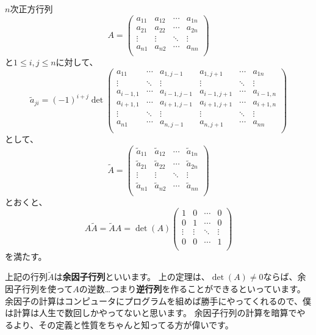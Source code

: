 \begin{theorem}
  $n$次正方行列
  \[
    A=\begin{pmatrix}
      a_{11} & a_{12} & \cdots & a_{1n}\\
      a_{21} & a_{22} & \cdots & a_{2n}\\
      \vdots & \vdots & \ddots & \vdots\\
      a_{n1} & a_{n2} & \cdots & a_{nn}\\
    \end{pmatrix}
  \]
  と$1\leq i,j\leq n$に対して、
  \[
    \widetilde{a}_{ji}=(-1)^{i+j}\det\begin{pmatrix}
      a_{11} & \cdots & a_{1,j-1} & a_{1,j+1} & \cdots & a_{1n}\\
      \vdots & \ddots & \vdots & \vdots & \ddots & \vdots\\
      a_{i-1,1} & \cdots & a_{i-1,j-1} & a_{i-1,j+1} & \cdots & a_{i-1,n}\\
      a_{i+1,1} & \cdots & a_{i+1,j-1} & a_{i+1,j+1} & \cdots & a_{i+1,n}\\
      \vdots & \ddots & \vdots & \vdots & \ddots & \vdots\\
      a_{n1} & \cdots & a_{n,j-1} & a_{n,j+1} & \cdots & a_{nn}\\
    \end{pmatrix}
  \]
  として、
  \[
    \widetilde{A}=\begin{pmatrix}
      \widetilde{a}_{11} & \widetilde{a}_{12} & \cdots & \widetilde{a}_{1n}\\
      \widetilde{a}_{21} & \widetilde{a}_{22} & \cdots & \widetilde{a}_{2n}\\
      \vdots & \vdots & \ddots & \vdots\\
      \widetilde{a}_{n1} & \widetilde{a}_{n2} & \cdots & \widetilde{a}_{nn}\\
    \end{pmatrix}
  \]
  とおくと、
  \[
    A\widetilde{A}=\widetilde{A}A=\det(A)\begin{pmatrix}
      1 & 0 & \cdots & 0\\
      0 & 1 & \cdots & 0\\
      \vdots & \vdots & \ddots & \vdots\\
      0 & 0 & \cdots & 1\\
    \end{pmatrix}
  \]
  を満たす。
\end{theorem}
上記の行列$\widetilde{A}$は\textbf{余因子行列}といいます。
上の定理は、$\det(A)\neq0$ならば、余因子行列を使って$A$の逆数…つまり\textbf{逆行列}を作ることができるといっています。
余因子の計算はコンピュータにプログラムを組めば勝手にやってくれるので、僕は計算は人生で数回しかやってないと思います。
余因子行列の計算を暗算でやるより、その定義と性質をちゃんと知ってる方が偉いです。

